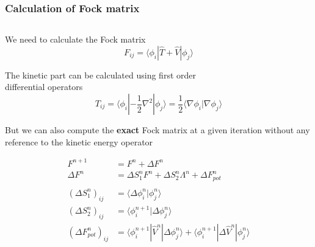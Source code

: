 \begin{frame}
    \frametitle{Calculation of Fock matrix}
    \begin{columns}
    \begin{column}[b]{0.55\textwidth}
    \centering
    We need to calculate the Fock matrix
    \begin{equation}
        \nonumber
        F_{ij} = \langle \phi_i | \hat{T} + \hat{V} | \phi_j \rangle
    \end{equation}

    \vspace{5mm}

    The kinetic part can be calculated using first order \\
    differential operators
    \begin{equation}
        \nonumber
        T_{ij} =
        \langle \phi_i | -\frac{1}{2}\nabla^2 | \phi_j \rangle = 
        \frac{1}{2}\langle \nabla \phi_i | \nabla \phi_j \rangle 
    \end{equation}

    \vspace{8mm}
    \pause

    But we can also compute the \textbf{exact} Fock matrix at a given iteration 
    without any reference to the kinetic energy operator

    \begin{align}
        \nonumber
        F^{n+1}    &= F^n + \Delta F^n\\
        \nonumber
        \Delta F^n &= \Delta S_1^nF^{n}+\Delta S_2^n\Lambda^n+\Delta F_{pot}^n\\
        \nonumber
        & \\
        \nonumber
        (\Delta S_1^n)_{ij} &= \langle \Delta \phi_i^n | \phi_j^n \rangle\\
        \nonumber
        (\Delta S_2^n)_{ij} &= \langle \phi_i^{n+1} | \Delta \phi_j^n \rangle\\
        \nonumber
        (\Delta F_{pot}^n)_{ij}
        &= \langle \phi_i^{n+1} | \hat{V}^n | \Delta\phi_j^n \rangle
        + \langle \phi_i^{n+1} | \Delta\hat{V}^n | \phi_j^n \rangle
    \end{align}

    \vspace{2mm}

    \end{column}


\end{columns}
\end{frame}
